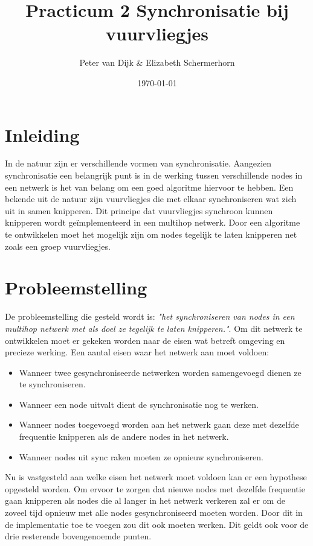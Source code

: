 \documentclass{article}
\author{Peter van Dijk \& Elizabeth Schermerhorn}
\date{\today}
\title{Practicum 2 Synchronisatie bij vuurvliegjes}
\begin{document}
\maketitle
\newpage
\tableofcontents
\clearpage
\section{Inleiding}
In de natuur zijn er verschillende vormen van synchronisatie. Aangezien synchronisatie een belangrijk punt is in de werking tussen verschillende nodes in een netwerk is het van belang om een goed algoritme hiervoor te hebben. Een bekende uit de natuur zijn vuurvliegjes die met elkaar synchroniseren wat zich uit in samen knipperen. Dit principe dat vuurvliegjes synchroon kunnen knipperen wordt ge\"{i}mplementeerd in een multihop netwerk. Door een algoritme te ontwikkelen moet het mogelijk zijn om nodes tegelijk te laten knipperen net zoals een groep vuurvliegjes. 
\newpage
\section{Probleemstelling}
De probleemstelling die gesteld wordt is: \textit{"het synchroniseren van nodes in een multihop netwerk met als doel ze tegelijk te laten knipperen."}. Om dit netwerk te ontwikkelen moet er gekeken worden naar de eisen wat betreft omgeving en precieze werking. Een aantal eisen waar het netwerk aan moet voldoen:
 \begin{itemize}
 \item Wanneer twee gesynchroniseerde netwerken worden samengevoegd dienen ze te synchroniseren.
 \item Wanneer een node uitvalt dient de synchronisatie nog te werken.
 \item Wanneer nodes toegevoegd worden aan het netwerk gaan deze met dezelfde frequentie knipperen als de andere nodes in het netwerk.
 \item Wanneer nodes uit sync raken moeten ze opnieuw synchroniseren. 
 \end{itemize}

Nu is vastgesteld aan welke eisen het netwerk moet voldoen kan er een hypothese opgesteld worden. 
Om ervoor te zorgen dat nieuwe nodes met dezelfde frequentie gaan knipperen als nodes die al langer in het netwerk verkeren zal er om de zoveel tijd opnieuw met alle nodes gesynchroniseerd moeten worden. Door dit in de implementatie toe te voegen zou dit ook moeten werken. Dit geldt ook voor de drie resterende bovengenoemde punten. 
\newpage
\end{document}
